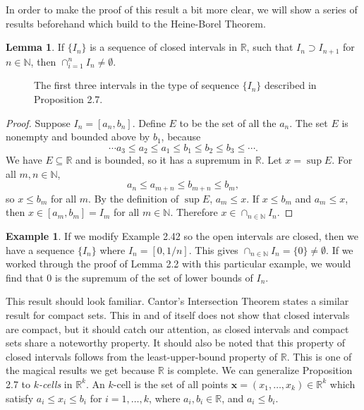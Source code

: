 \documentclass{article}
\newcommand{\N}{\mathbb{N}}
\newcommand{\R}{\mathbb{R}}
\newcommand{\x}{\mathbf{x}}
\theoremstyle{definition}
\newtheorem{lemma}{Lemma}[section]
\newtheorem{example}{Example}[section]
\begin{document}
	In order to make the proof of this result a bit more clear, we will show a series of results beforehand which build to the Heine-Borel Theorem.
	\begin{lemma}
		If $ \{I_n\} $ is a sequence of closed intervals in $ \R $, such that $ I_n\supset I_{n+1} $  for $ n\in\N $, then $ \cap_{i=1}^n I_n\neq\emptyset$.
	\end{lemma}  
	\begin{figure}[h]
		\centering
		\caption{The first three intervals in the type of sequence $ \{I_n\} $ described in Proposition 2.7.}
	\end{figure}
	\begin{proof}
		Suppose $ I_n=[a_n,b_n] $. Define $ E $ to be the set of all the $ a_n $. The set $ E $ is nonempty and bounded above by $ b_1 $, because $$\cdots a_3\le a_2\le a_1\le b_1\le b_2\le b_3\le \cdots .$$ We have $ E\subseteq \R $ and is bounded, so it has a supremum in $ \R $. Let $ x=\sup E $. For all $ m,n\in\N $, $$a_n\le a_{m+n}\le b_{m+n}\le b_m ,$$ so $ x\le b_m $ for all $ m $. By the definition of $ \sup E $, $ a_m\le x $. If $ x\le b_m $ and $ a_m\le x $, then $ x\in[a_m,b_m]=I_m $ for all $ m\in\N $. Therefore $ x\in\cap_{n\in\N} I_n $.
	\end{proof}
	\begin{example}
		If we modify Example 2.42 so the open intervals are closed, then we have a sequence $ \{I_n\} $ where $ I_n=[0,1/n] $. This gives $ \cap_{n\in\N} I_n=\{0\}\neq\emptyset $. If we worked through the proof of Lemma 2.2 with this particular example, we would find that $ 0 $ is the supremum of the set of lower bounds of $ I_n $. 
	\end{example}
	This result should look familiar. Cantor's Intersection Theorem states a similar result for compact sets. This in and of itself does not show that closed intervals are compact, but it should catch our attention, as closed intervals and compact sets share a noteworthy property. It should also be noted that this property of closed intervals follows from the least-upper-bound property of $ \R $. This is one of the magical results we get because $ \R $ is complete.  We can generalize Proposition 2.7 to \textit{\color{red}$ k $-cells} in $ \R^k $. An  $ k $-cell is the set of all points $ \x=(x_1,\ldots,x_k)\in\R^k $ which satisfy $ a_i\le x_i\le b_i $ for $ i=1,\ldots,k $, where $ a_i,b_i\in\R $, and $ a_i\le b_i $. 
\end{document}
